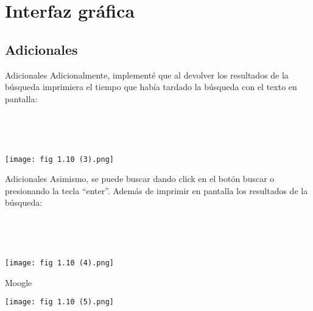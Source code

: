 \section{Interfaz gráfica}

\subsection{Adicionales}
\begin{frame}{Adicionales}
    Adicionalmente, implementé que al devolver los resultados de la búsqueda imprimiera el tiempo que había
tardado la búsqueda con el texto en pantalla:

\pause

\

\

\begin{center}
    \texttt{[image: fig 1.10 (3).png]}
\end{center}
\end{frame}

\begin{frame}{Adicionales}
    Asimismo, se puede buscar dando click en el botón buscar o presionando la tecla “enter”.
    Además de imprimir en pantalla los resultados de la búsqueda:

\pause

\

\

\begin{center}
    \texttt{[image: fig 1.10 (4).png]}
\end{center}
\end{frame}

\begin{frame}{Moogle}
    \begin{center}
        \texttt{[image: fig 1.10 (5).png]}
    \end{center}
\end{frame}